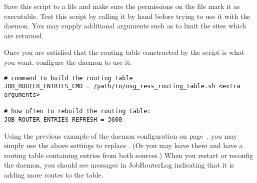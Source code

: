 Save this script to a file and make sure the permissions on the file
mark it as executable.  Test this script by calling it by hand before
trying to use it with the  daemon.  You may supply additional arguments
such as  to limit the sites which are returned.

Once you are satisfied that the routing table constructed by the
script is what you want, configure the  daemon to use it:

\begin{verbatim}
# command to build the routing table
JOB_ROUTER_ENTRIES_CMD = /path/to/osg_ress_routing_table.sh <extra arguments>

# how often to rebuild the routing table:
JOB_ROUTER_ENTRIES_REFRESH = 3600
\end{verbatim}

Using the previous example of the  daemon configuration on
page~\pageref{ExampleJobRouterConfiguration}, you may simply use the
above settings to replace .  (Or you may
leave  there and have a routing table
containing entries from both sources.)  When you restart or reconfig
the  daemon, you should see messages in JobRouterLog indicating that it
is adding more routes to the table.
